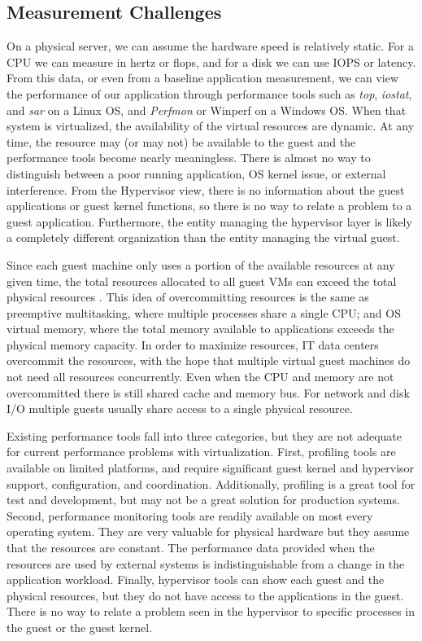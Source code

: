 \subsection{Measurement Challenges}
On a physical server, we can assume the hardware speed is relatively static.  For a CPU we can measure in hertz or flops, and for a disk we can use IOPS or latency.  From this data, or even from a baseline application measurement, we can view the performance of our application through performance tools such as \emph{top}, \emph{iostat}, and \emph{sar} on a Linux OS, and \emph{Perfmon} or {Winperf} on a Windows OS.  When that system is virtualized, the availability of the virtual resources are dynamic.  At any time, the resource may (or may not) be available to the guest and the performance tools become nearly meaningless.  There is almost no way to distinguish between a poor running application, OS kernel issue, or external interference.  From the Hypervisor view, there is no information about the guest applications or guest kernel functions, so there is no way to relate a problem to a guest application.  Furthermore, the entity managing the hypervisor layer is likely a completely different organization than the entity managing the virtual guest. 

Since each guest machine only uses a portion of the available resources at any given time, the total resources allocated to all guest VMs can exceed the total physical resources \cite{huber2, amit, buell1}.   This idea of overcommitting resources is the same as preemptive multitasking, where multiple processes share a single CPU; and OS virtual memory, where the total memory available to applications exceeds the physical memory capacity.  In order to maximize resources, IT data centers overcommit the resources, with the hope that multiple virtual guest machines do not need all resources concurrently.  
Even when the CPU and memory are not overcommitted there is still shared cache and memory bus.  For network and disk I/O multiple guests usually share access to a single physical resource.

Existing performance tools fall into three categories, but they are not adequate for current performance problems with virtualization.
First, profiling tools are available on limited platforms, and require significant guest kernel and hypervisor support, configuration, and coordination.  Additionally, profiling is a great tool for test and development, but may not be a great solution for production systems.  
Second, performance monitoring tools are readily available on most every operating system.  They are very valuable for physical hardware but they assume that the resources are constant.  The performance data provided when the resources are used by external systems is indistinguishable from a change in the application workload.
Finally, hypervisor tools can show each guest and the physical resources, but they do not have access to the applications in the guest.  There is no way to relate a problem seen in the hypervisor to specific processes in the guest or the guest kernel. 

